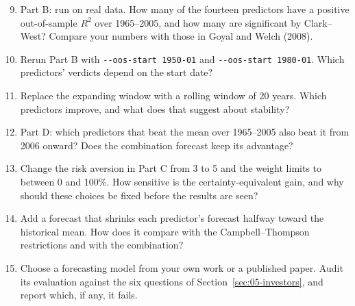 \begin{enumerate}
  \setcounter{enumi}{8}
  \item Part B: run on real data. How many of the fourteen predictors have a positive out-of-sample $R^2$ over 1965--2005, and how many are significant by Clark--West? Compare your numbers with those in Goyal and Welch (2008).
  \item Rerun Part B with \texttt{-{}-oos-start 1950-01} and \texttt{-{}-oos-start 1980-01}. Which predictors' verdicts depend on the start date?
  \item Replace the expanding window with a rolling window of 20 years. Which predictors improve, and what does that suggest about stability?
  \item Part D: which predictors that beat the mean over 1965--2005 also beat it from 2006 onward? Does the combination forecast keep its advantage?
  \item Change the risk aversion in Part C from 3 to 5 and the weight limits to between 0 and 100\%. How sensitive is the certainty-equivalent gain, and why should these choices be fixed before the results are seen?
  \item Add a forecast that shrinks each predictor's forecast halfway toward the historical mean. How does it compare with the Campbell--Thompson restrictions and with the combination?
  \item Choose a forecasting model from your own work or a published paper. Audit its evaluation against the six questions of Section~\ref{sec:05-investors}, and report which, if any, it fails.
\end{enumerate}

